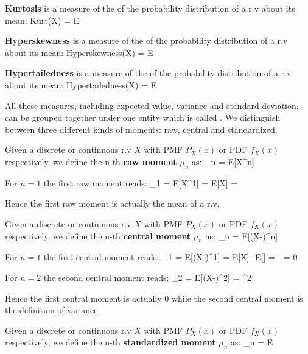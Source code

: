 
\vspace{10pt}

\bd[Kurtosis]
\textbf{Kurtosis} is a measure of the  of the probability distribution of a r.v about its mean:
\bse
Kurt(X) = E 
\ese
\ed

\vspace{10pt}


\vspace{5pt}

\bd[Hyperskewness]
\textbf{Hyperskewness} is a measure of the  of the probability distribution of a r.v about its mean:
\bse
Hyperskewness(X) = E 
\ese
\ed

\bd[Hypertailedness]
\textbf{Hypertailedness} is a measure of the  of the probability distribution of a r.v about its
mean:
\bse
Hypertailedness(X) = E 
\ese
\ed

All these measures, including expected value, variance and standard deviation, can be grouped together under one
entity which is called . We distinguish between three different kinds of moments: raw, central and
standardized.

Given a discrete or continuous r.v $X$ with PMF $P_{X}(x)$ or PDF $f_{X}(x)$ respectively, we define the n-th
\textbf{raw moment} $\mu_n$ as:
\bse
\mu_n = E[X^n]
\ese
\ed

For $n=1$ the first raw moment reads:
\bse
\mu_1 = E[X^1] = E[X] = \mu
\ese

Hence the first raw moment is actually the mean of a r.v.

Given a discrete or continuous r.v $X$ with PMF $P_{X}(x)$ or PDF $f_{X}(x)$ respectively, we define the n-th
\textbf{central moment} $\mu_n$ as:
\bse
\mu_n = E[(X-\mu)^n]
\ese
\ed

For $n=1$ the first central moment reads:
\bse
\mu_1 = E[(X-\mu)^1] = E[X]- E[\mu] = \mu - \mu = 0
\ese

For $n=2$ the second central moment reads:
\bse
\mu_2 = E[(X-\mu)^2] = \sigma^2
\ese

Hence the first central moment is actually 0 while the second central moment is the definition of variance.

Given a discrete or continuous r.v $X$ with PMF $P_{X}(x)$ or PDF $f_{X}(x)$ respectively, we define the n-th
\textbf{standardized moment} $\mu_n$ as:
\bse
\mu_n = E 
\ese
\ed


